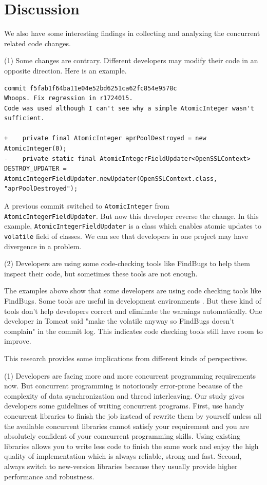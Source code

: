 \documentclass[conference]{IEEEtran}
\begin{document}
\section{Discussion}
We also have some interesting findings in collecting and analyzing the concurrent related code changes.

(1) Some changes are contrary. Different developers may modify their code in an opposite direction. Here is an example.

\begin{lstlisting}
commit f5fab1f64ba11e04e52bd6251ca62fc854e9578c
Whoops. Fix regression in r1724015.
Code was used although I can't see why a simple AtomicInteger wasn't sufficient.

+    private final AtomicInteger aprPoolDestroyed = new AtomicInteger(0);
-    private static final AtomicIntegerFieldUpdater<OpenSSLContext> DESTROY_UPDATER = AtomicIntegerFieldUpdater.newUpdater(OpenSSLContext.class, "aprPoolDestroyed");
\end{lstlisting}

A previous commit switched to \texttt{AtomicInteger} from \texttt{AtomicIntegerFieldUpdater}. But now this developer reverse the change. In this example, \texttt{AtomicIntegerFieldUpdater} is a class which enables atomic updates to \texttt{volatile} field of classes. We can see that developers in one project may have divergence in a problem.

(2) Developers are using some code-checking tools like FindBugs to help them inspect their code, but sometimes these tools are not enough.

The examples above show that some developers are using code checking tools like FindBugs. Some tools are useful in development environments \cite{conf/oopsla/AyewahPMPZ07}. But these kind of tools don't help developers correct and eliminate the warnings automatically. One developer in Tomcat said "make the volatile anyway so FindBugs doesn't complain" in the commit log. This indicates code checking tools still have room to improve.

This research provides some implications from different kinds of perspectives.

(1) Developers are facing more and more concurrent programming requirements now. But concurrent programming is notoriously error-prone because of the complexity of data synchronization and thread interleaving. Our study gives developers some guidelines of writing concurrent programs. First, use handy concurrent libraries to finish the job instead of rewrite them by yourself unless all the available concurrent libraries cannot satisfy your requirement and you are absolutely confident of your comcurrent programming skills. Using existing libraries allows you to  write less code to finish the same work and enjoy the high quality of implementation which is always reliable, strong and fast. Second, always switch to new-version libraries because they usually provide higher performance and robustness.
\end{document}
